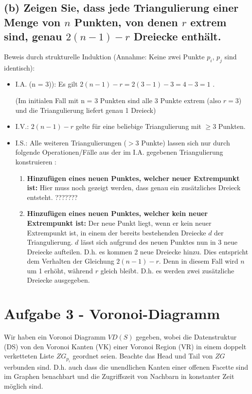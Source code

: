 \documentclass[a4paper]{article}
\begin{document}
\subsection*{(b) Zeigen Sie, dass jede Triangulierung einer Menge von $n$ Punkten, von denen $r$ extrem sind, genau $2 (n - 1) - r$ Dreiecke enthält.}

Beweis durch strukturelle Induktion (Annahme: Keine zwei Punkte $p_i$, $p_j$ sind identisch):

\begin{itemize}
	\item I.A. (n = 3)): Es gilt $2 (n - 1) - r = 2 (3 - 1) - 3 = 4 - 3 = 1$ . \checkmark
	
	(Im initialen Fall mit  n = 3 Punkten sind alle 3 Punkte extrem (also $r = 3$) und die Triangulierung liefert genau 1 Dreieck) 
	\item I.V.: $2 (n - 1) - r$ gelte für eine beliebige Triangulierung mit $\geq 3$ Punkten.
	\item I.S.: Alle weiteren Triangulierungen ($> 3$ Punkte) lassen sich nur durch folgende Operationen/Fälle aus der im I.A. gegebenen Triangulierung konstruieren :
	\begin{enumerate}
		\item \textbf{Hinzufügen eines neuen Punktes, welcher neuer Extrempunkt ist:}
			Hier muss noch gezeigt werden, dass genau ein zusätzliches Dreieck entsteht.
			???????
		\item \textbf{Hinzufügen eines neuen Punktes, welcher kein neuer Extrempunkt ist:}
			Der neue Punkt liegt, wenn er kein neuer Extrempunkt ist, in einem der 
			bereits bestehenden Dreiecke $d$ der Triangulierung. $d$ lässt sich aufgrund
			des neuen Punktes nun in 3 neue Dreiecke aufteilen. D.h. es kommen 2 neue Dreiecke hinzu. Dies entspricht dem Verhalten 	der Gleichung $2 (n - 1) - r$. Denn in diesem Fall wird $n$ um 1 erhöht, während $r$ gleich bleibt. D.h. es werden zwei zusätzliche Dreiecke ausgegeben. \checkmark
	\end{enumerate}
\end{itemize}


\section*{Aufgabe 3 - Voronoi-Diagramm}


Wir haben ein Voronoi Diagramm $VD(S)$ gegeben, wobei die Datenstruktur (DS) von den Voronoi Kanten (VK) einer Voronoi Region (VR) in einem doppelt verketteten Liste $ZG_{p_i}$ geordnet seien. Beachte das Head und Tail von $ZG$ verbunden sind. D.h. auch dass die unendlichen Kanten einer offenen Facette sind im Graphen benachbart und die Zugriffszeit von Nachbarn in konstanter Zeit möglich sind.
\end{document}
